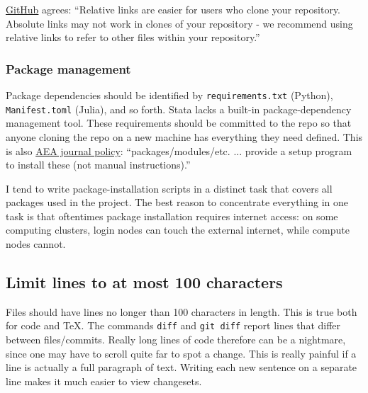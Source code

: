\href{https://help.github.com/articles/about-readmes/\#relative-links-and-image-paths-in-readme-files}{GitHub} agrees:
``Relative links are easier for users who clone your repository. Absolute links may not work in clones of your repository - we recommend using relative links to refer to other files within your repository.''

\subsubsection{Package management}

Package dependencies should be identified by \texttt{requirements.txt} (Python), \texttt{Manifest.toml} (Julia), and so forth.
Stata lacks a built-in package-dependency management tool.
These requirements should be committed to the repo so that anyone cloning the repo on a new machine has everything they need defined.
This is also \href{https://aeadataeditor.github.io/aea-de-guidance/preparing-for-data-deposit.html}{AEA journal policy}:
``packages/modules/etc. ... provide a setup program to install these (not manual instructions).''

I tend to write package-installation scripts in a distinct task that covers all packages used in the project.
The best reason to concentrate everything in one task is that oftentimes package installation requires internet access:
on some computing clusters, login nodes can touch the external internet, while compute nodes cannot.

\subsection{Limit lines to at most 100 characters}

Files should have lines no longer than 100 characters in length.
This is true both for code and \TeX.
The commands \texttt{diff} and \texttt{git diff} report lines that differ between files/commits.
Really long lines of code therefore can be a nightmare, since one may have to scroll quite far to spot a change.
This is really painful if a line is actually a full paragraph of text.
Writing each new sentence on a separate line makes it much easier to view changesets.

